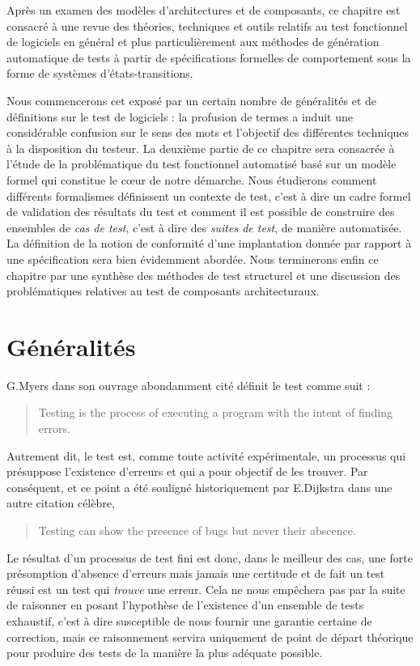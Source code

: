 \lstset{basicstyle=\footnotesize\sffamily}

Apr\`es un examen des mod\`eles d'architectures et de composants, ce
chapitre est consacr\'e \`a une revue des
th\'eories, techniques et outils relatifs au test fonctionnel de
logiciels en g\'en\'eral et plus particuli\`erement aux m\'ethodes
de g\'en\'eration automatique de tests \`a partir de
sp\'ecifications formelles de comportement sous la forme de
syst\`emes d'\'etats-transitions. 

Nous commencerons cet expos\'e par un certain nombre de
g\'en\'eralit\'es et de d\'efinitions sur le test de logiciels : la profusion de termes a induit une consid\'erable confusion sur
le sens des mots et l'objectif des diff\'erentes techniques \`a la
disposition du testeur. La deuxi\`eme partie de ce chapitre sera
consacr\'ee \`a l'\'etude de la probl\'ematique du test
fonctionnel automatis\'e bas\'e sur un mod\`ele formel qui constitue le c\oe ur
de notre d\'emarche. Nous \'etudierons comment diff\'erents
formalismes d\'efinissent un contexte de test, c'est \`a dire un
cadre formel de validation des r\'esultats du test et comment il est
possible de construire des ensembles de \emph{cas de test}, c'est \`a dire
des \emph{suites de test}, de mani\`ere automatis\'ee. La d\'efinition de
la  notion de conformit\'e d'une implantation donn\'ee par rapport
\`a une sp\'ecification sera bien \'evidemment abord\'ee. Nous terminerons enfin ce chapitre par une
synth\`ese des m\'ethodes de test structurel et une discussion des
probl\'ematiques relatives au test de composants architecturaux.

\section{G\'en\'eralit\'es}

G.Myers dans son ouvrage abondamment
cit\'e\cite{art-soft-test} d\'efinit le test comme suit : 
\begin{quote}
    \og Testing is the process of executing a program with the intent
    of finding errors.~\fg
\end{quote}

Autrement dit, le test est, comme toute activit\'e exp\'erimentale,
 un processus qui pr\'esuppose l'existence d'erreurs et qui a pour
objectif de les trouver. Par cons\'equent, et ce point a \'et\'e
soulign\'e historiquement par E.Dijkstra dans une autre
citation c\'el\`ebre,
\begin{quote}
    \og Testing can show the presence of bugs but never their abscence.\fg
\end{quote}
Le r\'esultat d'un processus de test fini est donc, dans le meilleur des
cas, une forte pr\'esomption d'absence d'erreurs mais jamais une
certitude et de fait un test r\'eussi est un test qui \emph{trouve} une
erreur. Cela ne nous emp\^echera pas par la suite de raisonner en posant
l'hypoth\`ese de l'existence d'un ensemble de tests exhaustif, c'est
\`a dire susceptible de nous fournir une garantie certaine de
correction, mais ce raisonnement servira uniquement de point de
d\'epart th\'eorique pour produire des tests de la mani\`ere la
plus ad\'equate possible.  


